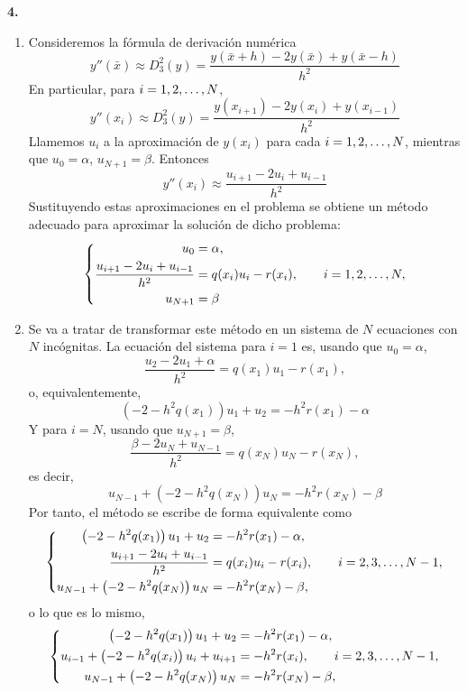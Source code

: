 \documentclass[11pt]{report}
\begin{document}
\textbf{4. }

\begin{enumerate}
    \item Consideremos la fórmula de derivación numérica
    \[y''(\bar{x}) \approx D_3^2(y) = \frac{y(\bar{x}+h)-2y(\bar{x})+y(\bar{x}-h)}{h^2}\]
    En particular, para $i = 1,2,\mathellipsis,N$,
    \[y''(x_i) \approx D_3^2(y) = \frac{y(x_{i+1})-2y(x_i)+y(x_{i-1})}{h^2}\]
    Llamemos $u_i$ a la aproximación de $y(x_i)$ para cada $i = 1,2,\mathellipsis,N$, mientras que $u_0 = \alpha$, $u_{N+1} = \beta$. Entonces
    \[y''(x_i) \approx \frac{u_{i+1}-2u_i+u_{i-1}}{h^2}\]
    Sustituyendo estas aproximaciones en el problema se obtiene un método adecuado para aproximar la solución de dicho problema:
    \[\left\{ \begin{alignedat}{1}
        u_0 &= \alpha, \\
        \frac{u_{i+1}-2u_i+u_{i-1}}{h^2} &= q(x_i)u_i- r(x_i), \qquad i = 1,2,\mathellipsis,N, \\
        u_{N+1} &= \beta
    \end{alignedat} \right.\]
    \item Se va a tratar de transformar este método en un sistema de $N$ ecuaciones con $N$ incógnitas. La ecuación del sistema para $i = 1$ es, usando que $u_0 = \alpha$,
    \[\frac{u_2-2u_1+\alpha}{h^2} = q(x_1)u_1-r(x_1),\]
    o, equivalentemente, 
    \[\left(-2-h^2q(x_1)\right)u_1+u_2 = -h^2r(x_1)-\alpha\]
    Y para $i = N$, usando que $u_{N+1}=\beta$,
    \[\frac{\beta-2u_N+u_{N-1}}{h^2} = q(x_N)u_N-r(x_N),\]
    es decir,
    \[u_{N-1}+\left(-2-h^2q(x_N)\right)u_N = -h^2r(x_N)-\beta\]
    Por tanto, el método se escribe de forma equivalente como
    \[\left\{ \begin{alignedat}{1}
        \left(-2-h^2q(x_1)\right)u_1+u_2 &= -h^2r(x_1)-\alpha, \\
        \frac{u_{i+1}-2u_i+u_{i-1}}{h^2} &= q(x_i)u_i- r(x_i), \qquad i = 2,3,\mathellipsis,N-1, \\
        u_{N-1}+\left(-2-h^2q(x_N)\right)u_N &= -h^2r(x_N)-\beta,
    \end{alignedat} \right.\]
    o lo que es lo mismo,
    \[\left\{ \begin{alignedat}{1}
    \left(-2-h^2q(x_1)\right)u_1+u_2 &= -h^2r(x_1)-\alpha, \\
    u_{i-1}+\left(-2-h^2q(x_i)\right)u_i+u_{i+1} &= -h^2r(x_i), \qquad i = 2,3,\mathellipsis,N-1, \\
    u_{N-1}+\left(-2-h^2q(x_N)\right)u_N &= -h^2r(x_N)-\beta,
    \end{alignedat} \right.\]

\end{enumerate}
\end{document}

